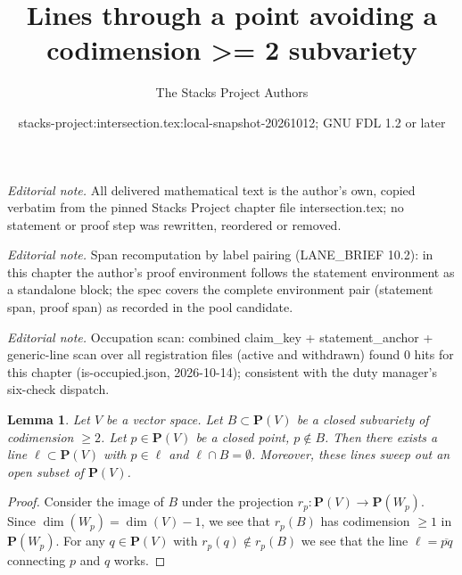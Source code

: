 \documentclass[10pt,a4paper]{amsart}
\title{Lines through a point avoiding a codimension >= 2 subvariety}
\author{The Stacks Project Authors}
\date{stacks-project:intersection.tex:local-snapshot-20261012; GNU FDL 1.2 or later}
\theoremstyle{plain}
\newtheorem{lemma}[subsection]{Lemma}
\theoremstyle{definition}
\theoremstyle{remark}
\numberwithin{equation}{subsection}
\begin{document}
\maketitle
\noindent\textit{Editorial note.} All delivered mathematical text is the author's own, copied verbatim from the pinned Stacks Project chapter file intersection.tex; no statement or proof step was rewritten, reordered or removed.\par\medskip
\noindent\textit{Editorial note.} Span recomputation by label pairing (LANE\_BRIEF 10.2): in this chapter the author's proof environment follows the statement environment as a standalone block; the spec covers the complete environment pair (statement span, proof span) as recorded in the pool candidate.\par\medskip
\noindent\textit{Editorial note.} Occupation scan: combined claim\_key + statement\_anchor + generic-line scan over all registration files (active and withdrawn) found 0 hits for this chapter (is-occupied.json, 2026-10-14); consistent with the duty manager's six-check dispatch.\par\medskip
\begin{lemma}
\label{lemma-find-lines}
Let $V$ be a vector space. Let $B \subset \mathbf{P}(V)$
be a closed subvariety of codimension $\geq 2$.
Let $p \in \mathbf{P}(V)$ be a closed point, $p \not \in B$.
Then there exists a line $\ell \subset \mathbf{P}(V)$
with $p \in \ell$ and $\ell \cap B = \emptyset$. Moreover, these lines
sweep out an open subset of $\mathbf{P}(V)$.
\end{lemma}

\begin{proof}
Consider the image of $B$ under the projection
$r_p : \mathbf{P}(V) \to \mathbf{P}(W_p)$.
Since $\dim(W_p) = \dim(V) - 1$, we see that $r_p(B)$
has codimension $\geq 1$ in $\mathbf{P}(W_p)$.
For any $q \in \mathbf{P}(V)$ with $r_p(q) \not \in r_p(B)$
we see that the line $\ell = \overline{pq}$ connecting $p$ and $q$ works.
\end{proof}
\end{document}
